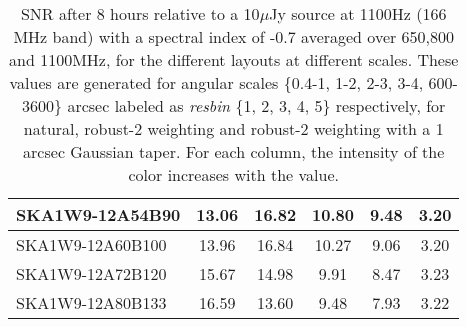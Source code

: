 \begin{table}[H]
{{\begin{tabular}{|lccccc|}
SKA1W9-12A54B90 & 13.06 \cellcolor{blue!18.00} & 16.82 \cellcolor{red!59.87} & 10.80 \cellcolor{green!60.00} & 9.48 \cellcolor{orange!60.00} & 3.20 \cellcolor{purple!18.00}\\ \hline 
SKA1W9-12A60B100 & 13.96 \cellcolor{blue!28.71} & 16.84 \cellcolor{red!60.00} & 10.27 \cellcolor{green!47.56} & 9.06 \cellcolor{orange!48.62} & 3.20 \cellcolor{purple!18.00}\\ \hline 
SKA1W9-12A72B120 & 15.67 \cellcolor{blue!49.05} & 14.98 \cellcolor{red!47.54} & 9.91 \cellcolor{green!39.12} & 8.47 \cellcolor{orange!32.63} & 3.23 \cellcolor{purple!26.40}\\ \hline 
SKA1W9-12A80B133 & 16.59 \cellcolor{blue!60.00} & 13.60 \cellcolor{red!38.30} & 9.48 \cellcolor{green!29.03} & 7.93 \cellcolor{orange!18.00} & 3.22 \cellcolor{purple!23.60}\\ \hline 
\end{tabular}}
\vspace{0.000000cm}
\hspace{1cm} 
\vspace{0.000000cm}
\hspace{1cm} 

\vspace{.50cm}
\caption{SNR after 8 hours relative to a 10$\mu$Jy source at 1100Hz (166 MHz band) with a spectral index of -0.7 averaged over 650,800 and 1100MHz, for the different layouts at different scales. These values are generated for angular scales \{0.4-1, 1-2, 2-3, 3-4, 600-3600\} arcsec labeled as {\it resbin} \{1, 2, 3, 4, 5\} respectively, for natural, robust-2 weighting and robust-2 weighting with a 1 arcsec Gaussian taper. For each column, the intensity of the color increases with the value.}\label{tab:snravg}}
 \end{table}
